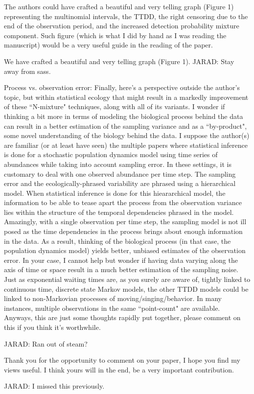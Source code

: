 \documentclass[12pt]{article}
\renewenvironment{quote}  %
              {\list{}{\rightmargin\leftmargin}\normalfont%
               \item\relax}
              {\endlist}
\newcommand{\jarad}[1]{{\color{Orange} JARAD: #1}}
\begin{document}
The authors could have crafted a beautiful and very telling graph (Figure 1) representing the multinomial intervals, the TTDD, the right censoring due to the end of the observation period, and the increased detection probability mixture component. Such figure (which is what I did by hand as I was reading the manuscript) would be a very useful guide in the reading of the paper.
\begin{quote}
We have crafted a beautiful and very telling graph (Figure 1).
\jarad{Stay away from sass.}
\end{quote}


Process vs. observation error: Finally, here's a perspective outside the author's topic, but within statistical ecology that might result in a markedly improvement of these ``N-mixture" techniques, along with all of its variants. I wonder if thinking a bit more in terms of modeling the biological process behind the data can result in a better estimation of the sampling variance and as a ``by-product", some novel understanding of the biology behind the data. I suppose the author(s) are familiar (or at least have seen) the multiple papers where statistical inference is done for a stochastic population dynamics model using time series of abundances while taking into account sampling error. In these settings, it is customary to deal with one observed abundance per time step. The sampling error and the ecologically-phrased variability are phrased using a hierarchical model.  When statistical inference is done for this hieararchical model, the information to be able to tease apart
the process from the observation variance lies within the structure of the temporal dependencies phrased in the model. Amazingly, with a single observation per time step, the sampling model is not ill posed as the time dependencies in the process brings about enough information in the data.  As a result, thinking of the biological process (in that case, the population dynamics model) yields better, unbiased estimates of the observation error. In your case, I cannot help but wonder if having data varying along the axis of time or space result in a much better estimation of the sampling noise. Just as exponential waiting times are, as you surely are aware of, tightly linked to continuous time, discrete state Markov models, the other TTDD models could be linked to non-Markovian processes of moving/singing/behavior.  In many instances, multiple observations in the same ``point-count" are available. Anyways, this are just some thoughts rapidly put together, please comment on this
if you think it's worthwhile.

\jarad{Ran out of steam?}

Thank you for the opportunity to comment on your paper, I hope you find my views useful.  I think yours will in the end, be a very important contribution.

\jarad{I missed this previously.}




\end{document}
